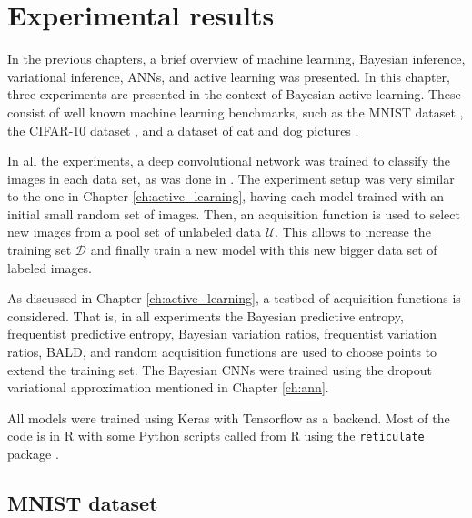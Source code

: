 
\chapter{Experimental results}
\label{ch:results}

In the previous chapters, a brief overview of machine learning, Bayesian inference, variational inference, ANNs, and active learning was presented. In this chapter, three experiments are presented in the context of Bayesian active learning. These consist of well known machine learning benchmarks, such as the MNIST dataset \cite{lecun1998gradient}, the CIFAR-10 dataset \cite{krizhevsky2009learning}, and a dataset of cat and dog pictures \cite{elson2007asirra}.

In all the experiments, a deep convolutional network was trained to classify the images in each data set, as was done in \cite{Gal2016Active}. The experiment setup was very similar to the one in Chapter \ref{ch:active_learning}, having each model trained with an initial small random set of images. Then, an acquisition function is used to select new images from a pool set of unlabeled data $\mathcal{U}$. This allows to increase the training set $\mathcal{D}$ and finally train a new model with this new bigger data set of labeled images.

As discussed in Chapter \ref{ch:active_learning}, a testbed of acquisition functions is considered. That is, in all experiments the Bayesian predictive entropy, frequentist predictive entropy, Bayesian variation ratios, frequentist variation ratios, BALD, and random acquisition functions are used to choose points to extend the training set. The Bayesian CNNs were trained using the dropout variational approximation mentioned in Chapter \ref{ch:ann}.

All models were trained using Keras\cite{chollet2015keras} with Tensorflow \cite{tensorflow2015-whitepaper} as a backend. Most of the code is in R with some Python scripts called from R using the \texttt{reticulate} package \cite{reticulate_package}.

\section{MNIST dataset}

